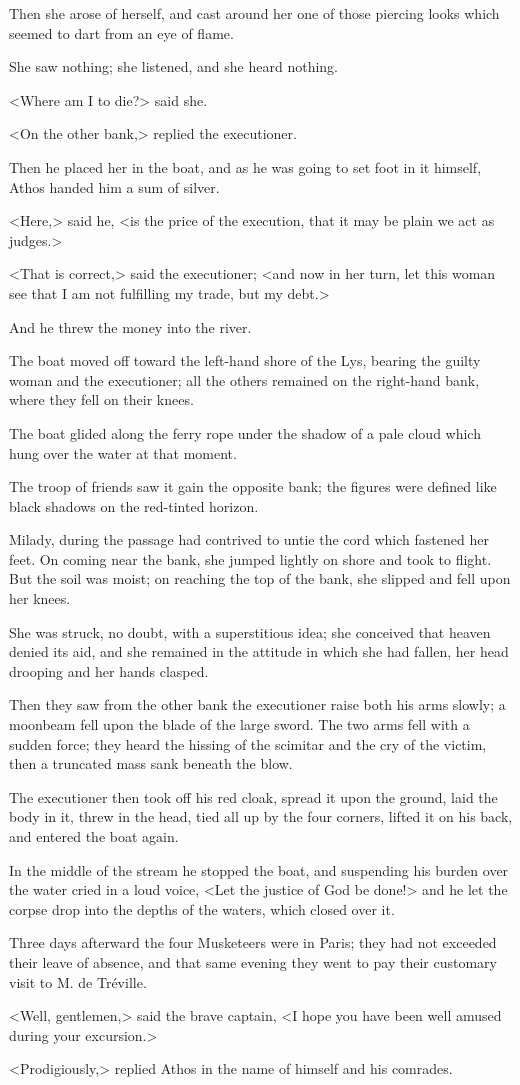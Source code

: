 Then she arose of herself, and cast around her one of those piercing looks which seemed to dart from an eye of flame. 

She saw nothing; she listened, and she heard nothing. 

<Where am I to die?> said she. 

<On the other bank,> replied the executioner. 

Then he placed her in the boat, and as he was going to set foot in it himself, Athos handed him a sum of silver. 

<Here,> said he, <is the price of the execution, that it may be plain we act as judges.> 

<That is correct,> said the executioner; <and now in her turn, let this woman see that I am not fulfilling my trade, but my debt.> 

And he threw the money into the river. 

The boat moved off toward the left-hand shore of the Lys, bearing the guilty woman and the executioner; all the others remained on the right-hand bank, where they fell on their knees. 

The boat glided along the ferry rope under the shadow of a pale cloud which hung over the water at that moment. 

The troop of friends saw it gain the opposite bank; the figures were defined like black shadows on the red-tinted horizon. 

Milady, during the passage had contrived to untie the cord which fastened her feet. On coming near the bank, she jumped lightly on shore and took to flight. But the soil was moist; on reaching the top of the bank, she slipped and fell upon her knees. 

She was struck, no doubt, with a superstitious idea; she conceived that heaven denied its aid, and she remained in the attitude in which she had fallen, her head drooping and her hands clasped. 

Then they saw from the other bank the executioner raise both his arms slowly; a moonbeam fell upon the blade of the large sword. The two arms fell with a sudden force; they heard the hissing of the scimitar and the cry of the victim, then a truncated mass sank beneath the blow. 

The executioner then took off his red cloak, spread it upon the ground, laid the body in it, threw in the head, tied all up by the four corners, lifted it on his back, and entered the boat again. 

In the middle of the stream he stopped the boat, and suspending his burden over the water cried in a loud voice, <Let the justice of God be done!> and he let the corpse drop into the depths of the waters, which closed over it. 

Three days afterward the four Musketeers were in Paris; they had not exceeded their leave of absence, and that same evening they went to pay their customary visit to M. de Tréville. 

<Well, gentlemen,> said the brave captain, <I hope you have been well amused during your excursion.> 

<Prodigiously,> replied Athos in the name of himself and his comrades.